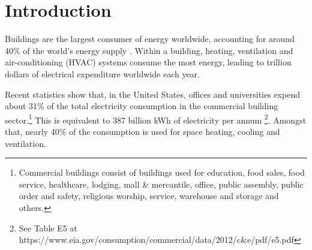 \chapter{Introduction}
\label{cha:intro}

Buildings are the largest consumer of energy worldwide, accounting for around 40\% of the world's energy supply \citep{macDonald2004commercial}. Within a building, heating, ventilation and air-conditioning (HVAC) systems consume the most energy, leading to trillion dollars of electrical expenditure worldwide each year. 


Recent statistics show that, in the United States, offices and universities expend about 31\% of the total electricity consumption in the commercial building sector.\footnote{Commercial buildings consist of buildings used for education, food sales, food service, healthcare, lodging, mall \& mercantile, office, public assembly, public order and safety, religious worship, service, warehouse and storage and others.} This is equivalent to 387 billion kWh of electricity per annum \citep{eia2012cbecs}\footnote{See Table E5 at https://www.eia.gov/consumption/commercial/data/2012/c\&e/pdf/e5.pdf}. Amongst that, nearly 40\% of the consumption is used for space heating, cooling and ventilation. 

